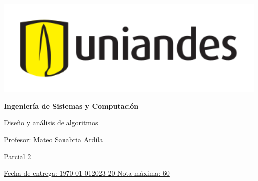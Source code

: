 \documentclass[12pt, a4paper]{exam}
\begin{document}
	\noindent
	\begin{minipage}[l]{0.1\textwidth}
		\noindent
		\includegraphics[width=1.8\textwidth]{Logosimbolo-uniandes_horizontal.png}
	\end{minipage}
\hfill
\begin{minipage}[c]{0.8\textwidth}
	\begin{center}
		{\large \textbf{Ingeniería de Sistemas y Computación} \par
		\large	Diseño y análisis de algoritmos	\par
		\small  Profesor: Mateo Sanabria Ardila	\par
		\small  Parcial 2	\par
		}
	\end{center}
\end{minipage}
\par
\vspace{0.2in}
\noindent
\uline{Fecha de entrega: \today 	\hfill  2023-20		\hfill Nota máxima: 60}
\par 
\vspace{0.15in}
\end{document}
